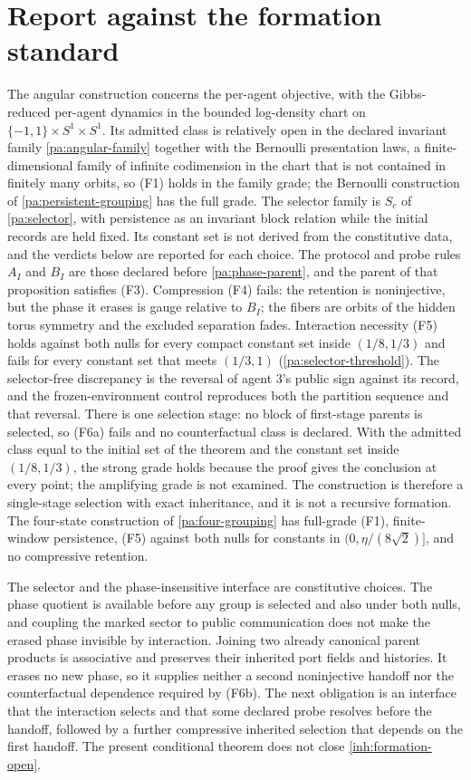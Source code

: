 \section{Report against the formation standard}

The angular construction concerns the per-agent objective, with the Gibbs-reduced per-agent dynamics in the bounded log-density chart on $\{-1,1\}\times S^1\times S^1$. Its admitted class is relatively open in the declared invariant family \cref{pa:angular-family} together with the Bernoulli presentation laws, a finite-dimensional family of infinite codimension in the chart that is not contained in finitely many orbits, so (F1) holds in the family grade; the Bernoulli construction of \cref{pa:persistent-grouping} has the full grade. The selector family is $S_c$ of \cref{pa:selector}, with persistence as an invariant block relation while the initial records are held fixed. Its constant set is not derived from the constitutive data, and the verdicts below are reported for each choice. The protocol and probe rules $A_I$ and $B_I$ are those declared before \cref{pa:phase-parent}, and the parent of that proposition satisfies (F3). Compression (F4) fails: the retention is noninjective, but the phase it erases is gauge relative to $B_I$; the fibers are orbits of the hidden torus symmetry and the excluded separation fades. Interaction necessity (F5) holds against both nulls for every compact constant set inside $(1/8,1/3)$ and fails for every constant set that meets $(1/3,1)$ (\cref{pa:selector-threshold}). The selector-free discrepancy is the reversal of agent $3$'s public sign against its record, and the frozen-environment control reproduces both the partition sequence and that reversal. There is one selection stage: no block of first-stage parents is selected, so (F6a) fails and no counterfactual class is declared. With the admitted class equal to the initial set of the theorem and the constant set inside $(1/8,1/3)$, the strong grade holds because the proof gives the conclusion at every point; the amplifying grade is not examined. The construction is therefore a single-stage selection with exact inheritance, and it is not a recursive formation. The four-state construction of \cref{pa:four-grouping} has full-grade (F1), finite-window persistence, (F5) against both nulls for constants in $(0,\eta/(8\sqrt2)]$, and no compressive retention.

The selector and the phase-insensitive interface are constitutive choices. The phase quotient is available before any group is selected and also under both nulls, and coupling the marked sector to public communication does not make the erased phase invisible by interaction. Joining two already canonical parent products is associative and preserves their inherited port fields and histories. It erases no new phase, so it supplies neither a second noninjective handoff nor the counterfactual dependence required by (F6b). The next obligation is an interface that the interaction selects and that some declared probe resolves before the handoff, followed by a further compressive inherited selection that depends on the first handoff. The present conditional theorem does not close \cref{inh:formation-open}.
